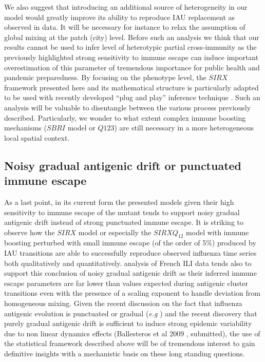 We also suggest that introducing an additional source of heterogeneity
in our model would greatly improve its ability to reproduce IAU
replacement as observed in data. It will be necessary for instance to
relax the assumption of global mixing at the patch (city) level.
Before such an analysis we think that our results cannot be used to
infer level of heterotypic partial cross-immunity as the previously
highlighted strong sensitivity to immune escape can induce important
overestimation of this parameter of tremendous importance for public
health and pandemic preparedness. By focusing on the phenotype level,
the $SIRX$ framework presented here and its mathematical structure is
particularly adapted to be used with recently developed ``plug and
play'' inference technique \citep{Ionides2006, Toni2009}. Such an
analysis will be valuable to disentangle between the various process
previously described. Particularly, we wonder to what extent complex
immune boosting mechanisms ($SBRI$ model or $Q123$) are still
necessary in a more heterogeneous local spatial context.


\subsection{Noisy gradual antigenic drift or punctuated immune escape}

As a last point, in its current form the presented models given their
high sensitivity to immune escape of the mutant tends to support noisy
gradual antigenic drift instead of strong punctuated immune escape. It
is striking to observe how the $SIRX$ model or especially the $SIRXQ_{12}$
model with immune boosting perturbed with small immune escape (of
the order of 5\%) produced by IAU transitions are able to
successfully reproduce observed influenza time series both
qualitatively and quantitatively. \citet{Finkenstaedt2005} analysis of
French ILI data tends also to support this conclusion of noisy gradual
antigenic drift as their inferred immune escape parameters are far
lower than values expected during antigenic cluster transitions even
with the presence of a scaling exponent to handle deviation from
homogeneous mixing. Given the recent discussion on the fact that
influenza antigenic evolution is punctuated or gradual (\textit{e.g}
\citep{Wolf2006, Shih2007, Suzuki2008}) and the recent discovery that
purely gradual antigenic drift is sufficient to induce strong epidemic
variability due to non linear dynamics effects (Ballesteros et al 2009
, submitted), the use of the statistical framework described
above will be of tremendous interest to gain definitive insights with
a mechanistic basis on these long standing questions.

